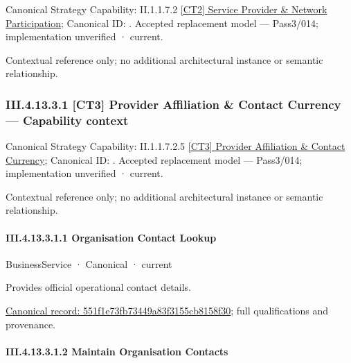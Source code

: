 {\small Canonical Strategy Capability: II.1.1.7.2 \hyperref[element:ceca5f9bdddb4a39bab531595e3547ff]{[CT2] Service Provider \& Network Participation}; Canonical ID: \texttt{}. Accepted replacement model — Pass3/014; implementation unverified · current.}\par
Contextual reference only; no additional architectural instance or semantic relationship.\par
\subsubsection*{III.4.13.3.1 [CT3] Provider Affiliation \& Contact Currency — Capability context}
\label{navigation:III.4.13.3.1}

{\small Canonical Strategy Capability: II.1.1.7.2.5 \hyperref[element:26090bfba56a4a36a7a0f4158ef04c5a]{[CT3] Provider Affiliation \& Contact Currency}; Canonical ID: \texttt{}. Accepted replacement model — Pass3/014; implementation unverified · current.}\par
Contextual reference only; no additional architectural instance or semantic relationship.\par
\paragraph*{III.4.13.3.1.1 Organisation Contact Lookup}
\label{navigation:III.4.13.3.1.1}

\label{element:551f1e73fb73449a83f3155cb8158f30}
{\small BusinessService · Canonical · current}\par

Provides official operational contact details.


{\footnotesize \href{../../../../../../../../continuum/business/business-service/551f1e73fb73449a83f3155cb8158f30.md}{Canonical record: 551f1e73fb73449a83f3155cb8158f30}; full qualifications and provenance.}\par
\paragraph*{III.4.13.3.1.2 Maintain Organisation Contacts}
\label{navigation:III.4.13.3.1.2}

